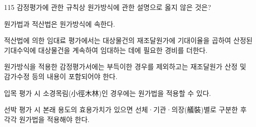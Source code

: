 \begin{question}{115}
감정평가에 관한 규칙상 원가방식에 관한 설명으로 옳지 않은 것은?
\begin{choices}
  \item 원가법과 적산법은 원가방식에 속한다.
  \item 적산법에 의한 임대료 평가에서는 대상물건의 재조달원가에 기대이율을 곱하여 산정된 기대수익에 대상물건을 계속하여 임대하는 데에 필요한 경비를 더한다.
  \item 원가방식을 적용한 감정평가서에는 부득이한 경우를 제외하고는 재조달원가 산정 및 감가수정 등의 내용이 포함되어야 한다.
  \item 입목 평가 시 소경목림(小徑木林)인 경우에는 원가법을 적용할 수 있다.
  \item 선박 평가 시 본래 용도의 효용가치가 있으면 선체·기관·의장(艤裝)별로 구분한 후 각각 원가법을 적용해야 한다.
\end{choices}
\end{question}
